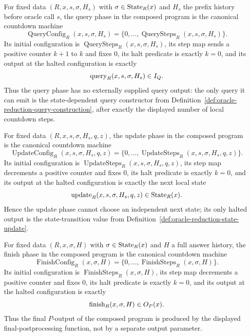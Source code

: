 \begin{definition}
  \label{def:composed-oracle-query-phase-machine}
  For fixed data $(R,x,s,\sigma,H_s)$ with
  $\sigma\in\operatorname{State}_R(x)$ and $H_s$ the prefix history before oracle call $s$,
  the query phase in the composed program is the canonical countdown machine
  \[
    \operatorname{QueryConfig}_{R}(x,s,\sigma,H_s)
      =\{0,\ldots,\operatorname{QuerySteps}_R(x,s,\sigma,H_s)\}.
  \]
  Its initial configuration is
  $\operatorname{QuerySteps}_R(x,s,\sigma,H_s)$, its step map sends a positive
  counter $k+1$ to $k$ and fixes $0$, its halt predicate is exactly
  $k=0$, and its output at the halted configuration is exactly
  \[
    \operatorname{query}_R(x,s,\sigma,H_s)\in I_Q .
  \]
  Thus the query phase has no externally supplied query output: the only query
  it can emit is the state-dependent query constructor from
  Definition~\ref{def:oracle-reduction-query-construction}, after exactly the
  displayed number of local countdown steps.
\end{definition}

\begin{definition}
  \label{def:composed-oracle-update-phase-machine}
  For fixed data $(R,x,s,\sigma,H_s,q,z)$, the update phase in the composed
  program is the canonical countdown machine
  \[
    \operatorname{UpdateConfig}_{R}(x,s,\sigma,H_s,q,z)
      =\{0,\ldots,\operatorname{UpdateSteps}_R(x,s,\sigma,H_s,q,z)\}.
  \]
  Its initial configuration is
  $\operatorname{UpdateSteps}_R(x,s,\sigma,H_s,q,z)$, its step map decrements a
  positive counter and fixes $0$, its halt predicate is exactly $k=0$, and its
  output at the halted configuration is exactly the next local state
  \[
    \operatorname{update}_R(x,s,\sigma,H_s,q,z)\in\operatorname{State}_R(x).
  \]
  Hence the update phase cannot choose an independent next state; its only
  halted output is the state-transition value from
  Definition~\ref{def:oracle-reduction-state-update}.
\end{definition}

\begin{definition}
  \label{def:composed-oracle-finish-phase-machine}
  For fixed data $(R,x,\sigma,H)$ with $\sigma\in\operatorname{State}_R(x)$ and $H$ a full
  answer history, the finish phase in the composed program is the canonical
  countdown machine
  \[
    \operatorname{FinishConfig}_{R}(x,\sigma,H)
      =\{0,\ldots,\operatorname{FinishSteps}_R(x,\sigma,H)\}.
  \]
  Its initial configuration is
  $\operatorname{FinishSteps}_R(x,\sigma,H)$, its step map decrements a positive
  counter and fixes $0$, its halt predicate is exactly $k=0$, and its output at
  the halted configuration is exactly
  \[
    \operatorname{finish}_R(x,\sigma,H)\in O_P(x).
  \]
  Thus the final $P$-output of the composed program is produced by the
  displayed final-postprocessing function, not by a separate output parameter.
\end{definition}

